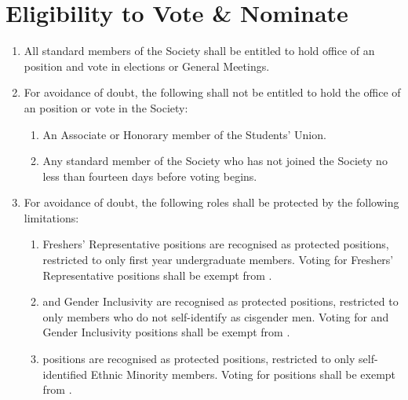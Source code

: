 \documentclass[a4paper,11pt,parskip=half-]{scrartcl} %
\begin{document}
\section{Eligibility to Vote \& Nominate}
    \begin{enumerate}
        \item All standard members of the Society shall be entitled to hold office of an \exec position and vote in elections or General Meetings.

        \item For avoidance of doubt, the following shall not be entitled to hold the office of an \exec position or vote in the Society:
            \begin{enumerate}
                \item An Associate or Honorary member of the Students' Union.

                \item Any standard member of the Society who has not joined the Society no less than fourteen days before voting begins.
            \end{enumerate}

        \item\label{prot-restrictions} For avoidance of doubt, the following roles shall be protected by the following limitations:
            \begin{enumerate}
                    \item\label{frep-restriction} Freshers' Representative positions are recognised as protected positions, restricted to only first year undergraduate members. Voting for Freshers' Representative positions shall be exempt from .

                    \item\label{gender-inclusivity-restriction}  and Gender Inclusivity  are recognised as protected positions, restricted to only members who do not self-identify as cisgender men. Voting for  and Gender Inclusivity  positions shall be exempt from .

                    \item\label{ethnic-minority-restriction}  positions are recognised as protected positions, restricted to only self-identified Ethnic Minority members. Voting for  positions shall be exempt from .


\end{enumerate}
\end{enumerate}
\end{document}
